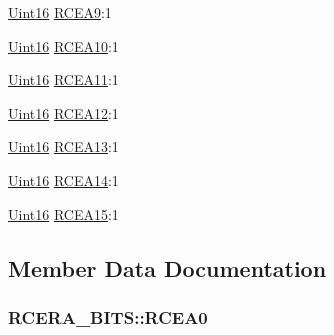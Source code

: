 \begin{DoxyCompactItemize}
\item 
\hyperlink{_d_s_p2833x___device_8h_a59a9f6be4562c327cbfb4f7e8e18f08b}{Uint16} \hyperlink{struct_r_c_e_r_a___b_i_t_s_ab0752e0f8f5d4394bac173b6b2df1fdc}{R\+C\+E\+A9}\+:1
\item 
\hyperlink{_d_s_p2833x___device_8h_a59a9f6be4562c327cbfb4f7e8e18f08b}{Uint16} \hyperlink{struct_r_c_e_r_a___b_i_t_s_aca5c8cdf242e7c4d88d19d0e7a928e05}{R\+C\+E\+A10}\+:1
\item 
\hyperlink{_d_s_p2833x___device_8h_a59a9f6be4562c327cbfb4f7e8e18f08b}{Uint16} \hyperlink{struct_r_c_e_r_a___b_i_t_s_ae1dfb650491600a6a01d6a88adce3690}{R\+C\+E\+A11}\+:1
\item 
\hyperlink{_d_s_p2833x___device_8h_a59a9f6be4562c327cbfb4f7e8e18f08b}{Uint16} \hyperlink{struct_r_c_e_r_a___b_i_t_s_aae5f1f0e2eaaa596ea59282a1272f893}{R\+C\+E\+A12}\+:1
\item 
\hyperlink{_d_s_p2833x___device_8h_a59a9f6be4562c327cbfb4f7e8e18f08b}{Uint16} \hyperlink{struct_r_c_e_r_a___b_i_t_s_aadf591d21b91c8c3a50269bde30b748f}{R\+C\+E\+A13}\+:1
\item 
\hyperlink{_d_s_p2833x___device_8h_a59a9f6be4562c327cbfb4f7e8e18f08b}{Uint16} \hyperlink{struct_r_c_e_r_a___b_i_t_s_afd4eb8c65d02cae66f56f93adb2c6531}{R\+C\+E\+A14}\+:1
\item 
\hyperlink{_d_s_p2833x___device_8h_a59a9f6be4562c327cbfb4f7e8e18f08b}{Uint16} \hyperlink{struct_r_c_e_r_a___b_i_t_s_a4974d6eecab02ed0311cea1db4ccaf25}{R\+C\+E\+A15}\+:1
\end{DoxyCompactItemize}


\subsection{Member Data Documentation}
\hypertarget{struct_r_c_e_r_a___b_i_t_s_a873e78b783d647e903ae3883e846eb50}{}
\subsubsection[{R\+C\+E\+A0}]{ R\+C\+E\+R\+A\+\_\+\+B\+I\+T\+S\+::\+R\+C\+E\+A0}\label{struct_r_c_e_r_a___b_i_t_s_a873e78b783d647e903ae3883e846eb50}
\hypertarget{struct_r_c_e_r_a___b_i_t_s_aa433713c8ea7ee5806aa5c9cb6ec02ea}{}
